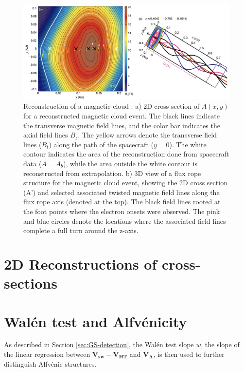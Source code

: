 \begin{figure}
    \centering
    \includegraphics[width=\textwidth]{Figures/Reconstructions/Hu2015_GSreconstruction.png}
    \caption[GS 2D reconstruction of a magnetic cloud]{Reconstruction of a magnetic cloud \citep{Hu:2015}: a) 2D cross section of $A(x,y)$ for a reconstructed magnetic cloud event. The black lines indicate the transverse magnetic field lines, and the color bar indicates the axial field lines $B_z$. The yellow arrows denote the transverse field lines ($B_t$) along the path of the spacecraft ($y=0$). The white contour indicates the area of the reconstruction done from spacecraft data ($A=A_b$), while the area outside the white contour is reconstructed from extrapolation. b) 3D view of a flux rope structure for the magnetic cloud event, showing the 2D cross section (A') and selected associated twisted magnetic field lines along the flux rope axis (denoted at the top). The black field lines  rooted at the foot points where the electron onsets were observed. The pink and blue circles denote the locations where the associated field lines complete a full turn around the z-axis.}
    \label{fig:GSreconstruction_Hu2015}
\end{figure}


\section{2D Reconstructions of cross-sections}

\section{Wal\'en test and Alfv\'enicity}
As described in Section \ref{sec:GS-detection}, the Wal\'en test slope $w$, the slope of the linear regression between $\mathbf{V_{sw}} - \mathbf{V_{HT}}$ and $\mathbf{V_A}$, is then used to further distinguish Alfv\'enic structures.

